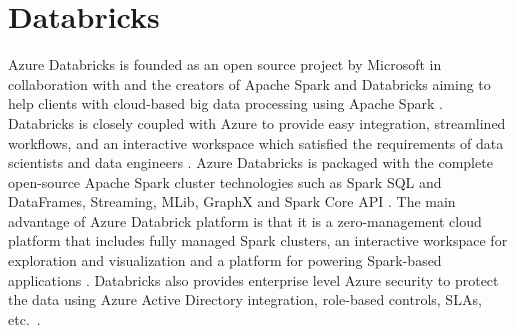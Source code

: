 \section{Databricks}

Azure Databricks is founded as an open source project by Microsoft in
collaboration with and the creators of Apache Spark and Databricks aiming to
help clients with cloud-based big data processing using Apache Spark
\cite{hid-sp18-409-www-databricks}. Databricks is closely coupled with Azure to
provide easy integration, streamlined workflows, and an interactive workspace
which satisfied the requirements of data scientists and data engineers
\cite{hid-sp18-409-www-databrick-doc}. Azure Databricks is packaged with the
complete open-source Apache Spark cluster technologies such as Spark SQL and
DataFrames, Streaming, MLib, GraphX and Spark Core API
\cite{hid-sp18-409-www-databrick-doc}. The main advantage of Azure Databrick
platform is that it is a zero-management cloud platform that includes fully
managed Spark clusters, an interactive workspace for exploration and
visualization and a platform for powering Spark-based applications
\cite{hid-sp18-409-www-databricks}. Databricks also provides enterprise level
Azure security to protect the data using Azure Active Directory integration,
role-based controls, SLAs, etc.~\cite{hid-sp18-409-www-databricks}.
